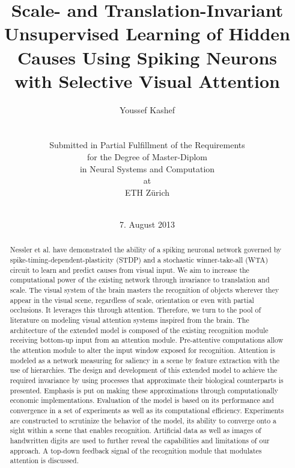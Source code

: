 \documentclass{report}
\begin{document}
\title{Scale- and Translation-Invariant Unsupervised Learning of Hidden Causes Using Spiking Neurons with Selective Visual Attention}
\author{Youssef Kashef\\
\\
\\
Submitted in Partial Fulfillment of the Requirements\\
for the Degree of Master-Diplom\\
in Neural Systems and Computation\\
at\\
ETH Z{\"u}rich\\
\\
}
\date{7. August 2013}

\maketitle
\tableofcontents

\begin{abstract}

Nessler et al. have demonstrated the ability of a spiking neuronal network governed by spike-timing-dependent-plasticity (STDP) and a stochastic winner-take-all (WTA) circuit to learn and predict causes from visual input. We aim to increase the computational power of the existing network through invariance to translation and scale. The visual system of the brain masters the recognition of objects wherever they appear in the visual scene, regardless of scale, orientation or even with partial occlusions. It leverages this through attention. Therefore, we turn to the pool of literature on modeling visual attention systems inspired from the brain. The architecture of the extended model is composed of the existing recognition module receiving bottom-up input from an attention module. Pre-attentive computations allow the attention module to alter the input window exposed for recognition. Attention is modeled as a network measuring for saliency in a scene by feature extraction with the use of hierarchies. The design and development of this extended model to achieve the required invariance by using processes that approximate their biological counterparts is presented. Emphasis is put on making these approximations through computationally economic implementations. Evaluation of the model is based on its performance and convergence in a set of experiments as well as its computational efficiency. Experiments are constructed to scrutinize the behavior of the model, its ability to converge onto a sight within a scene that enables recognition. Artificial data as well as images of handwritten digits are used to further reveal the capabilities and limitations of our approach. A top-down feedback signal of the recognition module that modulates attention is discussed.

\end{abstract}
\end{document}
